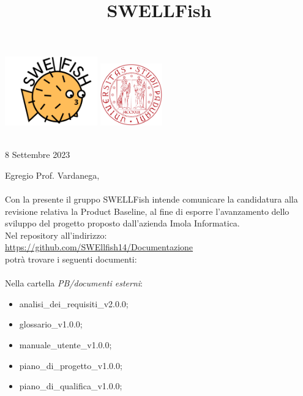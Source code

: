 \documentclass[12pt]{article}
\begin{document}
\graphicspath{ {../templates/img/} }
\title{SWELLFish}

\begin{center}
    \includegraphics[width=0.3\textwidth]{../templates/img/Swellfish_logo.png}
    \hspace{3cm}
    \includegraphics[width=0.2\textwidth]{../templates/img/logoUnipd.png}\\
    \end{center}
    \begin{flushright}
        \
        \textbf{}\\
        8 Settembre 2023
    \end{flushright}  

Egregio Prof. Vardanega,\\
\\
Con la presente il gruppo SWELLFish intende comunicare la candidatura alla revisione relativa la Product
Baseline, al fine di esporre l'avanzamento dello sviluppo del progetto proposto dall'azienda Imola Informatica.
\\

Nel repository all'indirizzo: \\
\href{https://github.com/SWEllfish14/Documentazione}{\underline{https://github.com/SWEllfish14/Documentazione}}\\ 
potrà trovare i seguenti documenti:\\\\

Nella cartella \textit{PB/documenti esterni}:
    \begin{itemize}
    \item analisi\_dei\_requisiti\_v2.0.0;
    \item glossario\_v1.0.0;
    \item manuale\_utente\_v1.0.0;
    \item piano\_di\_progetto\_v1.0.0;
    \item piano\_di\_qualifica\_v1.0.0;
    \end{itemize}
\end{document}

